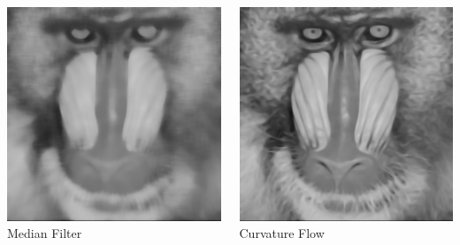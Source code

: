 \begin{frame}
\begin{columns}[c]
\begin{center}
\includegraphics[width=1\textwidth]{../Art/OpenCVITKex1.png} \\
Median Filter
\end{center}
\begin{center}
\includegraphics[width=1\textwidth]{../Art/OpenCVITKex1-ans.png} \\
Curvature Flow
\end{center}
\end{columns}
\end{frame}

